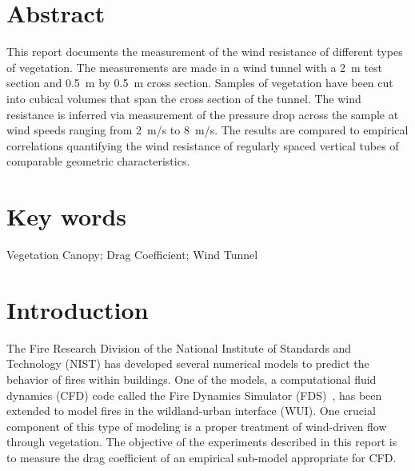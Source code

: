 \documentclass[12pt]{article}
\begin{document}
\pagestyle{plain}

\section*{Abstract}

This report documents the measurement of the wind resistance of different types of vegetation. The measurements are made in a wind tunnel with a 2~m test section and 0.5~m by 0.5~m cross section. Samples of vegetation have been cut into cubical volumes that span the cross section of the tunnel. The wind resistance is inferred via measurement of the pressure drop across the sample at wind speeds ranging from 2~m/s to 8~m/s. The results are compared to empirical correlations quantifying the wind resistance of regularly spaced vertical tubes of comparable geometric characteristics.

\section*{Key words}

Vegetation Canopy; Drag Coefficient; Wind Tunnel

\cleardoublepage

\begin{center}
	\tableofcontents
	\listoftables
	\listoffigures
\end{center}

\cleardoublepage

\pagestyle{plain}


\section{Introduction}
\label{sec:intro}

The Fire Research Division of the National Institute of Standards and Technology (NIST) has developed several numerical models to predict the behavior of fires within buildings. One of the models, a computational fluid dynamics (CFD) code called the Fire Dynamics Simulator (FDS)~\cite{FDS_Tech_Guide}, has been extended to model fires in the wildland-urban interface (WUI). One crucial component of this type of modeling is a proper treatment of wind-driven flow through vegetation. The objective of the experiments described in this report is to measure the drag coefficient of an empirical sub-model appropriate for CFD.
\end{document}
